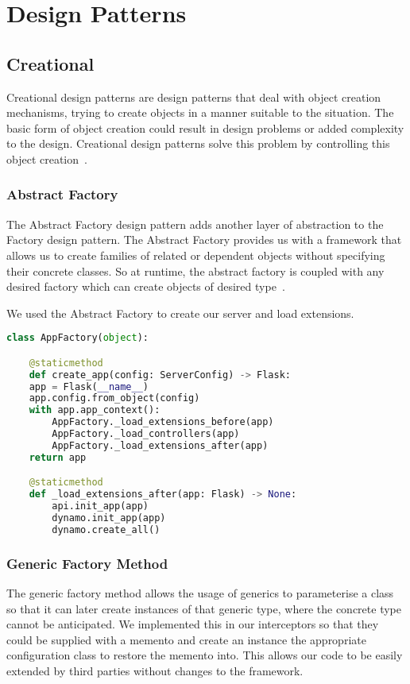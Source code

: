 \chapter{Design Patterns}

\section{Creational}
Creational design patterns are design patterns that deal with object creation
mechanisms, trying to create objects in a manner suitable to the situation. The basic form of object
creation could result in design problems or added complexity to the design. Creational design patterns
solve this problem by controlling this object creation~\citep{oodesign}.

\subsection{Abstract Factory}
The Abstract Factory design pattern adds another layer of abstraction to the Factory design pattern.
The Abstract Factory provides us with a framework that allows us to create families of related or
dependent objects without specifying their concrete classes. So at runtime, the abstract factory is
coupled with any desired factory which can create objects of desired type~\citep{oodesign}.

We used the Abstract Factory to create our server and load extensions.


\begin{lstlisting}[language=Python]
class AppFactory(object):

	@staticmethod
	def create_app(config: ServerConfig) -> Flask:
	app = Flask(__name__)
	app.config.from_object(config)
	with app.app_context():
		AppFactory._load_extensions_before(app)
		AppFactory._load_controllers(app)
		AppFactory._load_extensions_after(app)
	return app

	@staticmethod
	def _load_extensions_after(app: Flask) -> None:
		api.init_app(app)
		dynamo.init_app(app)
		dynamo.create_all()
\end{lstlisting}


\subsection{Generic Factory Method}
The generic factory method allows the usage of generics to parameterise a class so that it can later create instances
of that generic type, where the concrete type cannot be anticipated. We implemented this in our interceptors so
that they could be supplied with a memento and create an instance the appropriate configuration class to restore the
memento into. This allows our code to be easily extended by third parties without changes to the framework.

